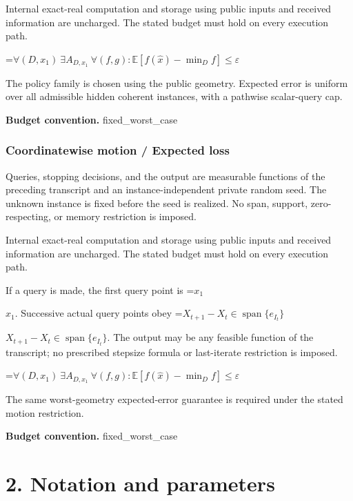 \documentclass[10pt,a4paper]{article}
\newcommand{\AtlasMath}[1]{\par\begingroup\centering\setbox0=\hbox{$\displaystyle #1$}\ifdim\wd0>1.4\linewidth\typeout{ATLAS WIDE FORMULA: \the\wd0}\fi\ifdim\wd0>\linewidth\resizebox{\linewidth}{!}{\box0}\else\box0\fi\par\endgroup}
\newcommand{\AtlasInlineMath}[1]{\begingroup\setbox0=\hbox{$#1$}\ifdim\wd0>.4\linewidth\endgroup\AtlasMath{#1}\else\endgroup$#1$\fi}
\begin{document}
Internal exact-real computation and storage using public inputs and received information are uncharged. The stated budget must hold on every execution path.




\AtlasMath{\forall(D,x_1)\ \exists A_{D,x_1}\ \forall(f,g):\mathbb E[f(\widehat x)-\min_Df]\le\varepsilon}




The policy family is chosen using the public geometry. Expected error is uniform over all admissible hidden coherent instances, with a pathwise scalar-query cap.



\textbf{Budget convention.} fixed\_worst\_case



\subsubsection{Coordinatewise motion / Expected loss}


Queries, stopping decisions, and the output are measurable functions of the preceding transcript and an instance-independent private random seed. The unknown instance is fixed before the seed is realized. No span, support, zero-respecting, or memory restriction is imposed.



Internal exact-real computation and storage using public inputs and received information are uncharged. The stated budget must hold on every execution path.



If a query is made, the first query point is \AtlasInlineMath{x_1}. Successive actual query points obey \AtlasInlineMath{X_{t+1}-X_t\in\operatorname{span}\{e_{I_t}\}}. The output may be any feasible function of the transcript; no prescribed stepsize formula or last-iterate restriction is imposed.




\AtlasMath{\forall(D,x_1)\ \exists A_{D,x_1}\ \forall(f,g):\mathbb E[f(\widehat x)-\min_Df]\le\varepsilon}




The same worst-geometry expected-error guarantee is required under the stated motion restriction.



\textbf{Budget convention.} fixed\_worst\_case



\section{2. Notation and parameters}
\end{document}
